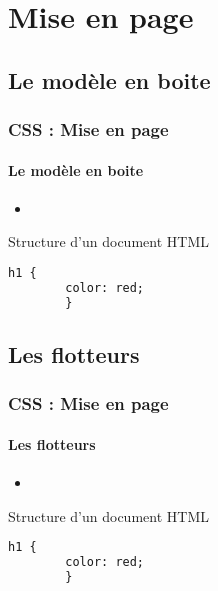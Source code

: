 \documentclass[xcolor=table]{beamer}
\begin{document}
\section{Mise en page}

\subsection{Le modèle en boite}

\begin{frame}[fragile]
\frametitle{CSS : Mise en page}
\framesubtitle{Le modèle en boite}

\begin{minipage}{0.60\textwidth}
	\begin{itemize}
		\item 
	\end{itemize}
\end{minipage}
%
\begin{minipage}{0.38\textwidth}
	\begin{block}{Structure d'un document HTML}
		\lstset{escapeinside=**}
		\scriptsize\bfseries
		\begin{lstlisting}[language={html}]
		h1 {
		color: red;
		}
		\end{lstlisting}
	\end{block}
\end{minipage}
\end{frame}


\subsection{Les flotteurs}

\begin{frame}[fragile]
\frametitle{CSS : Mise en page}
\framesubtitle{Les flotteurs}

\begin{minipage}{0.60\textwidth}
	\begin{itemize}
		\item 
	\end{itemize}
\end{minipage}
%
\begin{minipage}{0.38\textwidth}
	\begin{block}{Structure d'un document HTML}
		\lstset{escapeinside=**}
		\scriptsize\bfseries
		\begin{lstlisting}[language={html}]
		h1 {
		color: red;
		}
		\end{lstlisting}
	\end{block}
\end{minipage}
\end{frame}
\end{document}
